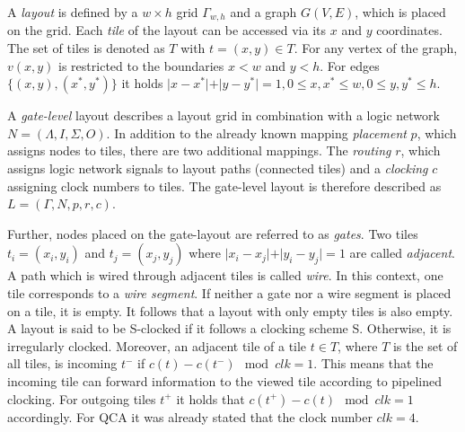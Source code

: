 \begin{definition}
	A \textit{layout} is defined by a $w \times h$ grid $\Gamma_{w, h}$ and a graph $G(V, E)$, which is placed on the grid. Each \textit{tile} of the layout can be accessed via its $x$ and $y$ coordinates. The set of tiles is denoted as $T$ with $t = (x, y) \in T$. For any vertex of the graph, $v(x, y)$ is restricted to the boundaries $x < w$ and $y < h$. For edges $\{(x, y), (x^*, y^*)\}$ it holds $\vert x-x^*\vert+\vert y-y^*\vert = 1, 0 \leq x, x^* \leq w, 0 \leq y, y^* \leq h$.
\end{definition}

\begin{definition}
	A \textit{gate-level} layout describes a layout grid in combination with a logic network $N = (\Lambda, I, \Sigma, O)$. In addition to the already known mapping \textit{placement} $p$, which assigns nodes to tiles, there are two additional mappings. The \textit{routing} $r$, which assigns logic network signals to layout paths (connected tiles) and a \textit{clocking} $c$ assigning clock numbers to tiles. The gate-level layout is therefore described as $L = (\Gamma, N, p, r, c)$.
	
	Further, nodes placed on the gate-layout are referred to as \textit{gates}. Two tiles $t_i = (x_i, y_i)$ and $t_j = (x_j, y_j)$ where $\vert x_i-x_j\vert+\vert y_i-y_j\vert = 1$ are called \textit{adjacent}. A path which is wired through adjacent tiles is called \textit{wire}. In this context, one tile corresponds to a \textit{wire segment}. If neither a gate nor a wire segment is placed on a tile, it is empty. It follows that a layout with only empty tiles is also empty. A layout is said to be S-clocked if it follows a clocking scheme S. Otherwise, it is irregularly clocked. Moreover, an adjacent tile of a tile $t \in T$, where $T$ is the set of all tiles, is incoming $t^-$ if $c(t) - c(t^-) \mod{clk} = 1$. This means that the incoming tile can forward information to the viewed tile according to pipelined clocking. For outgoing tiles $t^+$ it holds that $c(t^+) - c(t) \mod{clk} = 1$ accordingly. For QCA it was already stated that the clock number $clk = 4$.
\end{definition}

